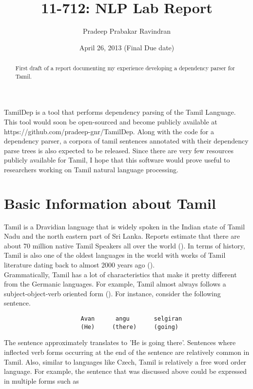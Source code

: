 \documentclass[11pt,letterpaper]{article}
\title{11-712:  NLP Lab Report}
\author{Pradeep Prabakar Ravindran}
\date{April 26, 2013 (Final Due date)}
\newcommand{\nascomment}[1]{\textcolor{blue}{\textbf{[#1 --NAS]}}}
\begin{document}
\maketitle
\begin{abstract}
First draft of a report documenting my experience developing a dependency parser for Tamil.
\end{abstract}

TamilDep is a tool that performs dependency parsing of the Tamil Language. This tool would soon be open-sourced
and become publicly available at https://github.com/pradeep-gnr/TamilDep. Along with
the code for a dependency parser, a corpora of tamil sentences annotated with their dependency parse trees 
is also expected to be released. Since there are very
few resources publicly available for Tamil,  I hope that this software would prove useful to researchers working on Tamil natural
language processing.

\section{Basic Information about Tamil}

Tamil is a Dravidian language that is widely spoken in the Indian state of Tamil Nadu
and the north eastern part of Sri Lanka. Reports estimate that there are about
70 million native Tamil Speakers all over the world (\cite{Wiki}). In terms of history, Tamil is also one of the oldest languages in the world with works of Tamil
literature dating back to almost 2000 years ago (\cite{Wiki}).\\

Grammatically, Tamil has a lot of characteristics that make it pretty different
from the Germanic languages. For example, Tamil almost always follows a subject-object-verb
oriented form (\cite{ramasamy2011tamil}). For instance, consider the following sentence.

\begin{center}
\begin{verbatim}
                      Avan      angu       selgiran 
                      (He)     (there)     (going)  
\end{verbatim}
\end{center}

The sentence approximately translates to 'He is going there'. Sentences where inflected verb forms
occurring at the end of the sentence are relatively common in Tamil. Also, similar to languages like Czech, 
Tamil is relatively a free word order language. For example, the sentence that was discussed above 
could be expressed in multiple forms such as
\end{document}
